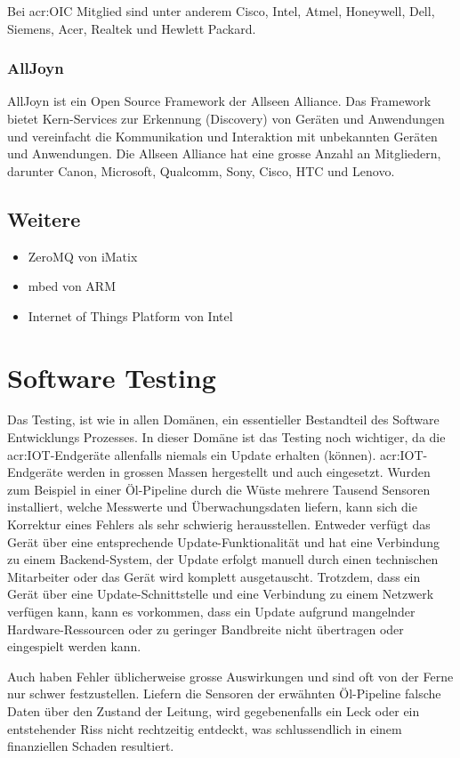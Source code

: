 Bei \gls{acr:OIC} Mitglied sind unter anderem Cisco, Intel, Atmel, Honeywell, Dell, Siemens, Acer, Realtek und Hewlett Packard.

\subsubsection{AllJoyn}
AllJoyn ist ein Open Source Framework  der Allseen Alliance. Das Framework bietet Kern-Services zur Erkennung (Discovery) von Geräten und Anwendungen und vereinfacht die Kommunikation und Interaktion mit unbekannten Geräten und Anwendungen. Die Allseen Alliance hat eine grosse Anzahl an Mitgliedern, darunter Canon, Microsoft, Qualcomm, Sony, Cisco, HTC und Lenovo.

\subsection{Weitere}
\begin{itemize}
\item ZeroMQ von iMatix
\item mbed von ARM
\item Internet of Things Platform von Intel
\end{itemize}


\section{Software Testing}
Das Testing, ist wie in allen Domänen, ein essentieller Bestandteil des Software Entwicklungs Prozesses. In dieser Domäne ist das Testing noch wichtiger, da die \gls{acr:IOT}-Endgeräte allenfalls niemals ein Update erhalten (können). \gls{acr:IOT}-Endgeräte werden in grossen Massen hergestellt und auch eingesetzt. Wurden zum Beispiel in einer Öl-Pipeline durch die Wüste mehrere Tausend Sensoren installiert, welche Messwerte und Überwachungsdaten liefern, kann sich die Korrektur eines Fehlers als sehr schwierig herausstellen. Entweder verfügt das Gerät über eine entsprechende Update-Funktionalität und hat eine Verbindung zu einem Backend-System, der Update erfolgt manuell durch einen technischen Mitarbeiter oder das Gerät wird komplett ausgetauscht. Trotzdem, dass ein Gerät über eine Update-Schnittstelle und eine Verbindung zu einem Netzwerk verfügen kann, kann es vorkommen, dass ein Update aufgrund mangelnder Hardware-Ressourcen oder zu geringer Bandbreite nicht übertragen oder eingespielt werden kann.

Auch haben Fehler üblicherweise grosse Auswirkungen und sind oft von der Ferne nur schwer festzustellen. Liefern die Sensoren der erwähnten Öl-Pipeline falsche Daten über den Zustand der Leitung, wird gegebenenfalls ein Leck oder ein entstehender Riss nicht rechtzeitig entdeckt, was schlussendlich in einem finanziellen Schaden resultiert.


